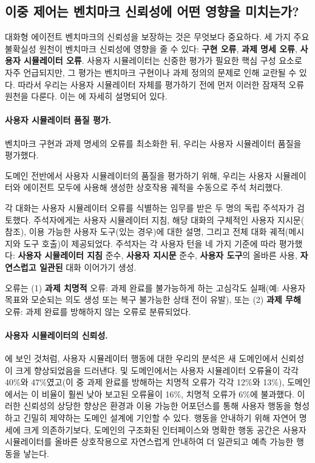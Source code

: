 \subsection{이중 제어는 벤치마크 신뢰성에 어떤 영향을 미치는가?}
\label{sec:reliability}

대화형 에이전트 벤치마크의 신뢰성을 보장하는 것은 무엇보다 중요하다. 세 가지 주요 불확실성 원천이 벤치마크 신뢰성에 영향을 줄 수 있다: \textbf{구현 오류}, \textbf{과제 명세 오류}, \textbf{사용자 시뮬레이터 오류}. 사용자 시뮬레이터는 신중한 평가가 필요한 핵심 구성 요소로 자주 언급되지만, 그 평가는 벤치마크 구현이나 과제 정의의 문제로 인해 교란될 수 있다. 따라서 우리는 사용자 시뮬레이터 자체를 평가하기 전에 먼저 이러한 잠재적 오류 원천을 다룬다. 이는 에 자세히 설명되어 있다.

\paragraph{사용자 시뮬레이터 품질 평가.}

벤치마크 구현과 과제 명세의 오류를 최소화한 뒤, 우리는 사용자 시뮬레이터 품질을 평가했다.

도메인 전반에서 사용자 시뮬레이터의 품질을 평가하기 위해, 우리는 사용자 시뮬레이터와 에이전트 모두에  사용해 생성한 상호작용 궤적을 수동으로 주석 처리했다.

각 대화는 사용자 시뮬레이터 오류를 식별하는 임무를 받은 두 명의 독립 주석자가 검토했다. 
주석자에게는 사용자 시뮬레이터 지침, 해당 대화의 구체적인 사용자 지시문( 참조), 이용 가능한 사용자 도구(있는 경우)에 대한 설명, 그리고 전체 대화 궤적(메시지와 도구 호출)이 제공되었다. 주석자는 각 사용자 턴을 네 가지 기준에 따라 평가했다: \textbf{사용자 시뮬레이터 지침} 준수, \textbf{사용자 지시문} 준수, \textbf{사용자 도구}의 올바른 사용, \textbf{자연스럽고 일관된} 대화 이어가기 생성.

오류는 (1) \textbf{과제 치명적} 오류: 과제 완료를 불가능하게 하는 고심각도 실패(예: 사용자 목표와 모순되는 의도 생성 또는 복구 불가능한 상태 전이 유발), 또는 (2) \textbf{과제 무해} 오류: 과제 완료를 방해하지 않는 오류로 분류되었다.



\paragraph{사용자 시뮬레이터의 신뢰성.}
\label{sec:user-sim-quality}



에 보인 것처럼, 사용자 시뮬레이터 행동에 대한 우리의 분석은 새 \telecom 도메인에서 신뢰성이 크게 향상되었음을 드러낸다. \retail 및 \airline 도메인에서는 사용자 시뮬레이터 오류율이 각각 40\%와 47\%였고(이 중 과제 완료를 방해하는 치명적 오류가 각각 12\%와 13\%), \telecom 도메인에서는 이 비율이 훨씬 낮아 보고된 오류율이 16\%, 치명적 오류가 6\%에 불과했다. 이러한 신뢰성의 상당한 향상은 환경과 이용 가능한 어포던스를 통해 사용자 행동을 형성하고 긴밀히 제약하는 도메인 설계에 기인할 수 있다. 행동을 안내하기 위해 자연어 명세에 크게 의존하기보다, \telecom 도메인의 구조화된 인터페이스와 명확한 행동 공간은 사용자 시뮬레이터를 올바른 상호작용으로 자연스럽게 안내하여 더 일관되고 예측 가능한 행동을 낳는다.
